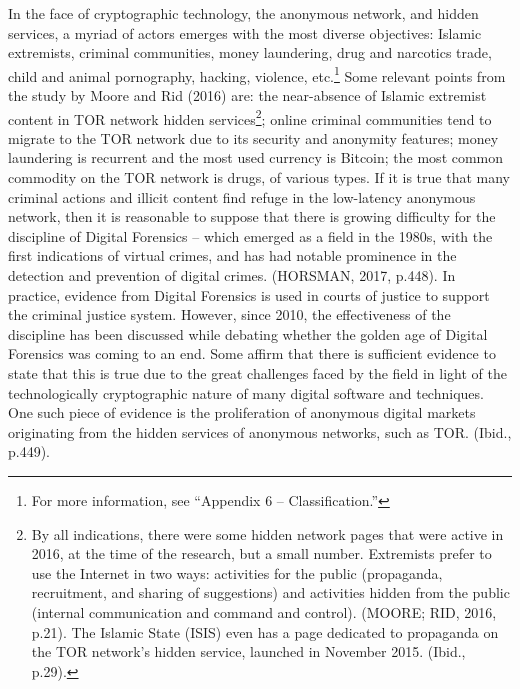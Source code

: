 In the face of cryptographic technology, the anonymous network, and hidden services, a myriad of actors emerges with the most diverse objectives: Islamic extremists, criminal communities, money laundering, drug and narcotics trade, child and animal pornography, hacking, violence, etc.\footnote{For more information, see ``Appendix 6 -- Classification.''} Some relevant points from the study by Moore and Rid (2016) are: the near-absence of Islamic extremist content in TOR network hidden services\footnote{By all indications, there were some hidden network pages that were active in 2016, at the time of the research, but a small number. Extremists prefer to use the Internet in two ways: activities for the public (propaganda, recruitment, and sharing of suggestions) and activities hidden from the public (internal communication and command and control). (MOORE; RID, 2016, p.21). The Islamic State (ISIS) even has a page dedicated to propaganda on the TOR network's hidden service, launched in November 2015. (Ibid., p.29).}; online criminal communities tend to migrate to the TOR network due to its security and anonymity features; money laundering is recurrent and the most used currency is Bitcoin; the most common commodity on the TOR network is drugs, of various types. If it is true that many criminal actions and illicit content find refuge in the low-latency anonymous network, then it is reasonable to suppose that there is growing difficulty for the discipline of Digital Forensics -- which emerged as a field in the 1980s, with the first indications of virtual crimes, and has had notable prominence in the detection and prevention of digital crimes. (HORSMAN, 2017, p.448). In practice, evidence from Digital Forensics is used in courts of justice to support the criminal justice system. However, since 2010, the effectiveness of the discipline has been discussed while debating whether the golden age of Digital Forensics was coming to an end. Some affirm that there is sufficient evidence to state that this is true due to the great challenges faced by the field in light of the technologically cryptographic nature of many digital software and techniques. One such piece of evidence is the proliferation of anonymous digital markets originating from the hidden services of anonymous networks, such as TOR. (Ibid., p.449).

